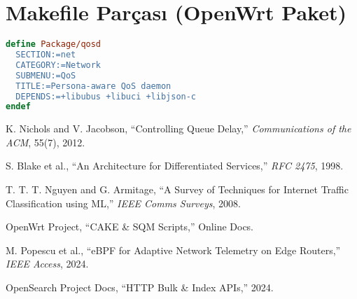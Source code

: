 \documentclass[11pt,a4paper]{article}
\begin{document}
\section{Makefile Parçası (OpenWrt Paket)}
\begin{lstlisting}[language=make]
define Package/qosd
  SECTION:=net
  CATEGORY:=Network
  SUBMENU:=QoS
  TITLE:=Persona-aware QoS daemon
  DEPENDS:=+libubus +libuci +libjson-c
endef
\end{lstlisting}

\begin{thebibliography}{9}
K. Nichols and V. Jacobson, ``Controlling Queue Delay,'' \emph{Communications of the ACM}, 55(7), 2012.

S. Blake et al., ``An Architecture for Differentiated Services,'' \emph{RFC 2475}, 1998.

T. T. T. Nguyen and G. Armitage, ``A Survey of Techniques for Internet Traffic Classification using ML,'' \emph{IEEE Comms Surveys}, 2008.

OpenWrt Project, ``CAKE \& SQM Scripts,'' Online Docs.

M. Popescu et al., ``eBPF for Adaptive Network Telemetry on Edge Routers,'' \emph{IEEE Access}, 2024.

OpenSearch Project Docs, ``HTTP Bulk \& Index APIs,'' 2024.
\end{thebibliography}
\end{document}

